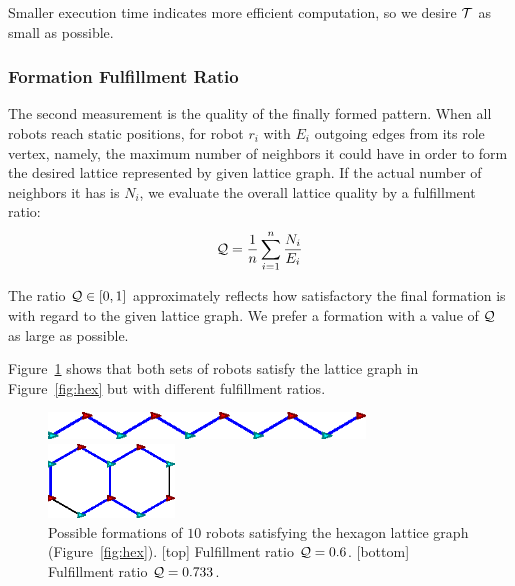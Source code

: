 Smaller execution time indicates more efficient computation, so we desire $\mathcal{T}$ as small as possible.

\subsubsection{Formation Fulfillment Ratio}

The second measurement is the quality of the finally formed pattern.
%
When all robots reach static positions, for robot $r_i$
with $E_i$ outgoing edges from its role vertex, 
namely, the maximum number of neighbors it could have in order to form the desired lattice represented by given lattice graph. 
If the actual number of neighbors it has is $N_i$, 
we evaluate the overall lattice quality by a fulfillment ratio:
\begin{equation}\label{eq:gamma}
  \mathcal{Q} = \dfrac{1}{n}\sum\limits_{i=1}^n \frac{N_i}{E_i}
\end{equation}

The ratio $\mathcal{Q} \in [0, 1]$ approximately reflects how satisfactory the final formation is 
with regard to the given lattice graph. 
%
We prefer a formation with a value of $\mathcal{Q}$ as large as possible.

Figure~\ref{fig:hex-qual} shows that both sets of robots satisfy the lattice
graph in Figure~\ref{fig:hex} but with different fulfillment ratios.
\begin{figure}  
    \centering
    \begin{minipage}[b]{0.95\linewidth}
        \centering
        \includegraphics[width=0.75\textwidth]{figs/bad-hexagon}
        
    \end{minipage}
    \begin{minipage}[b]{0.95\linewidth}
        \centering
        \includegraphics[width=0.3\textwidth]{figs/good-hexagon}
    \end{minipage}
    \caption{Possible formations of $10$ robots satisfying the hexagon lattice graph (Figure~\ref{fig:hex}). 
    [top] Fulfillment ratio $\mathcal{Q}=0.6$. 
    [bottom] Fulfillment ratio $\mathcal{Q} = 0.733$.}
    \label{fig:hex-qual}
\end{figure}


